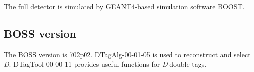 \documentclass[aps,preprint,tightenlines,superscriptaddress,showpacs,byrevtex,amsmath,amssymb,nofloatfix]{revtex4}
\begin{document}
%
%
%

The full detector is simulated by GEANT4-based simulation software BOOST.%



\subsection{BOSS version}
The BOSS version is 702p02. DTagAlg-00-01-05 is used to reconstruct and select \emph{D}. DTagTool-00-00-11 provides useful functions for \emph{D}-double tags.
\end{document}
